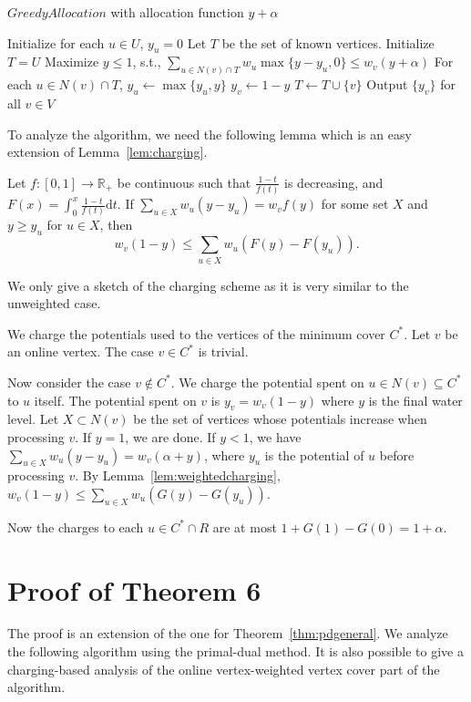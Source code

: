 \documentclass{article}
\begin{document}
\begin{algorithm}[h!]
\SetAlgoLined
\caption{$GreedyAllocation$ with allocation function $y+\alpha$}
\label{alg:general greedy}
Initialize for each $u\in U$, $y_u = 0$\;
Let $T$ be the set of known vertices. Initialize $T=U$\;
{
Maximize $y\le 1$, s.t., $\sum_{u\in N(v)\cap T} w_u\max\{y-y_u,0\} \leq w_v(y+\alpha)$\;
For each $u\in N(v)\cap T$, $y_u \leftarrow \max\{ y_u, y\}$\;
$y_v \leftarrow 1-y$\;
$T\leftarrow T\cup \{v\}$\;
}
Output $\{y_v\}$ for all $v\in V$\;
\end{algorithm}

To analyze the algorithm, we need the following lemma which is an easy extension of Lemma~\ref{lem:charging}.

\begin{lemma}
\label{lem:weightedcharging}
Let $f:[0,1]\longrightarrow\mathbb{R}_+$ be continuous such that $\frac{1-t}{f(t)}$ is decreasing, and $F(x)=\int_0^x  \frac{1-t}{f(t)}\mathrm{d}t$. If $\sum_{u\in X} w_u(y-y_u)= w_vf(y)$ for some set $X$ and $y\geq y_u$ for $u\in X$, then
$$w_v(1-y)\leq \sum_{u\in X} w_u\left(F(y)-F(y_u)\right).$$
\end{lemma}

We only give a sketch of the charging scheme as it is very similar to the unweighted case.

We charge the potentials used to the vertices of the minimum cover $C^*$. Let $v$ be an online vertex. The case $v\in C^*$ is trivial.

Now consider the case $v\notin C^*$. We charge the potential spent on $u\in N(v)\subseteq C^*$ to $u$ itself. The potential spent on $v$ is $y_v = w_v(1-y)$ where $y$ is the final water level. 
Let $X\subset N(v)$ be the set of vertices whose potentials increase when processing $v$.
If $y =1$, we are done. If $y <1$, we have $\sum_{u\in X} w_u(y-y_u) = w_v(\alpha +y)$, where $y_u$ is the potential of $u$ before processing $v$. By Lemma~\ref{lem:weightedcharging}, $w_v(1-y) \leq \sum_{u\in X} w_u(G(y)-G(y_u))$.

Now the charges to each $u\in C^*\cap R$ are at most $1+G(1)-G(0)=1+\alpha$.

\section{ Proof of Theorem 6}
The proof is an extension of the one for Theorem~\ref{thm:pdgeneral}. We analyze the following algorithm using the primal-dual method. It is also possible to give a charging-based analysis of the online vertex-weighted vertex cover part of the algorithm.
\end{document}
